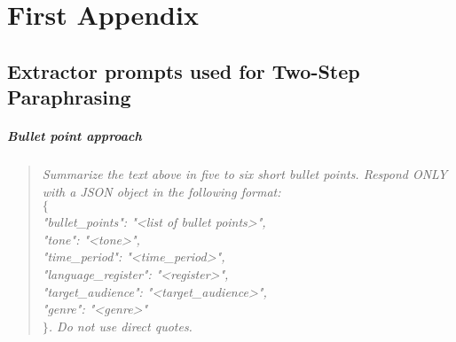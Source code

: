 \appendix
\chapter{First Appendix}
\label{ch:appendix}


\section{Extractor prompts used for Two-Step Paraphrasing}
\label{app:extractor_prompts}
\paragraph{Bullet point approach}
\begin{quote}
\textit{
Summarize the text above in five to six short bullet points. 
Respond ONLY with a JSON object in the following format: \\
$\{$ \\
\hspace{1em}"bullet\_points": "<list of bullet points>", \\
\hspace{1em}"tone": "<tone>", \\
\hspace{1em}"time\_period": "<time\_period>", \\
\hspace{1em}"language\_register": "<register>", \\
\hspace{1em}"target\_audience": "<target\_audience>", \\
\hspace{1em}"genre": "<genre>" \\
$\}$. 
Do not use direct quotes.
}
\end{quote}


